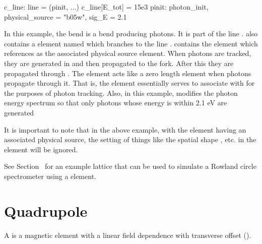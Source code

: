 {\begin{example}
  c_line: line = (pinit, ...)
  c_line[E_tot] = 15e3
  pinit: photon_init, physical_source = "b05w", sig_E = 2.1
\end{example}
In this example, the bend  is a bend producing photons. It is part of the line
.  also contains a  element named  which
branches to the line .  contains the  element  which
references  as the associated physical source element. When photons are tracked, they are
generated in  and then propagated to the  fork.  After this they are propagated
through . The  element acts like a zero length  element when photons
propagate through it. That is, the  element essentially serves to associate 
with  for the purposes of photon tracking. Also, in this example,  modifies the
photon energy spectrum so that only photons whose energy is within 2.1 eV are generated

It is important to note that in the above example, with the  element having an
associated physical source, the setting of things like the spatial shape , etc. in the
 element will be ignored.

See Section~ for an example lattice that can be used to simulate a Rowland circle
spectrometer using a  element.

\newpage

\section{Quadrupole}
\label{s:quad}

A  is a magnetic element with a linear field dependence
with transverse offset ().

}
